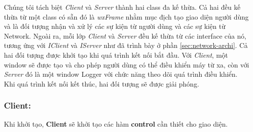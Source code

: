 Chúng tôi tách biệt \textit{Client} và \textit{Server} thành hai class đa kế thừa. Cả hai đều kế thừa từ một class có sẵn đó là \textit{wxFrame} nhằm mục địch tạo giao diện người dùng và là đối tượng nhận và xử lý các sự kiện từ người dùng và các sự kiện từ Network. Ngoài ra, mỗi lớp \textit{Client} và \textit{Server} đều kế thừa từ các interface của nó, tương ứng với \textit{IClient} và \textit{IServer} như đã trình bày ở phần \ref{sec:network-archi}. Cả hai đối tượng được khởi tạo khi quá trình kết nối bắt đầu. Với \textit{Client}, một window sẽ được tạo và cho phép người dùng có thể điều khiển máy từ xa, còn với \textit{Server} đó là một window Logger với chức năng theo dõi quá trình điều khiển. Khi quá trình kết nối kết thúc, hai đối tượng sẽ được giải phóng.

\subsubsection{Client: }
Khi khởi tạo, \textbf{Client} sẽ khởi tạo các hàm \textbf{control} cần thiết cho giao diện.

